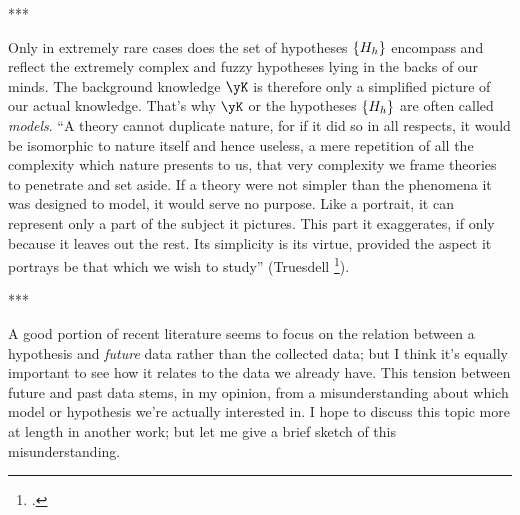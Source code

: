 \documentclass[\ifafour a4paper,12pt,\else a5paper,10pt,\fi%
onecolumn,oneside,article,%
british%
]{memoir}
\theoremstyle{remark}
\theoremstyle{innote}
\newcommand*{\citep}{\footcites}
\DeclarePairedDelimiter\set{\{}{\}} %
\renewcommand*{\|}[1][]{\nonscript\:#1\vert\nonscript\:\mathopen{}}
\renewcommand*{\=}{\TextOrMath\texteq\eq}
\begin{document}
***

Only in extremely rare cases does the set of hypotheses $\set{H_{h}}$
encompass and reflect the extremely complex and fuzzy hypotheses lying
in the backs of our minds. The background knowledge $\yK$ is therefore only
a simplified picture of our actual knowledge. That's why $\yK$ or the
hypotheses $\set{H_{h}}$ are often called \emph{models}.\; \enquote{A
  theory cannot duplicate nature, for if it did so in all respects, it
  would be isomorphic to nature itself and hence useless, a mere repetition
  of all the complexity which nature presents to us, that very complexity
  we frame theories to penetrate and set aside. If a theory were not
  simpler than the phenomena it was designed to model, it would serve no
  purpose. Like a portrait, it can represent only a part of the subject it
  pictures. This part it exaggerates, if only because it leaves out the
  rest. Its simplicity is its virtue, provided the aspect it portrays be
  that which we wish to study} (Truesdell \citep[Prologue p.~xvi]{truesdelletal1980}).

***

A good
portion of recent literature seems to focus on the relation between a
hypothesis and \emph{future} data rather than the collected data; but I
think it's equally important to see how it relates to the data we already
have. This tension between future and past data stems, in my opinion, from
a misunderstanding about which model or hypothesis we're actually
interested in. I hope to discuss this topic more at length in another work;
but let me give a brief sketch of this misunderstanding.
\end{document}

